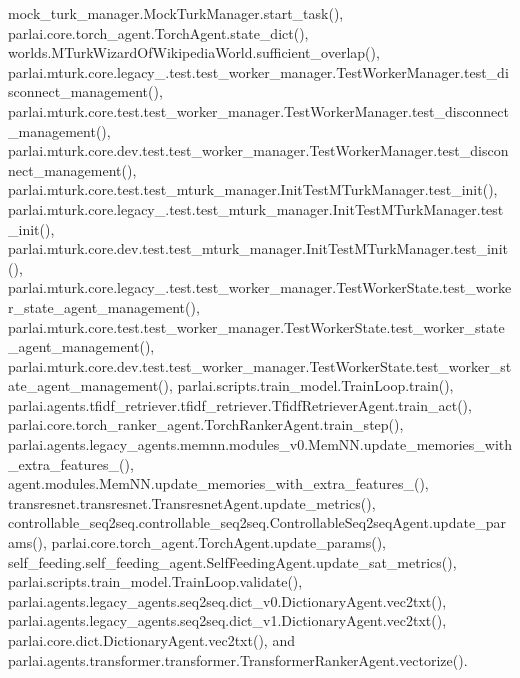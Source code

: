 mock\+\_\+turk\+\_\+manager.\+Mock\+Turk\+Manager.\+start\+\_\+task(), parlai.\+core.\+torch\+\_\+agent.\+Torch\+Agent.\+state\+\_\+dict(), worlds.\+M\+Turk\+Wizard\+Of\+Wikipedia\+World.\+sufficient\+\_\+overlap(), parlai.\+mturk.\+core.\+legacy\+\_.\+test.\+test\+\_\+worker\+\_\+manager.\+Test\+Worker\+Manager.\+test\+\_\+disconnect\+\_\+management(), parlai.\+mturk.\+core.\+test.\+test\+\_\+worker\+\_\+manager.\+Test\+Worker\+Manager.\+test\+\_\+disconnect\+\_\+management(), parlai.\+mturk.\+core.\+dev.\+test.\+test\+\_\+worker\+\_\+manager.\+Test\+Worker\+Manager.\+test\+\_\+disconnect\+\_\+management(), parlai.\+mturk.\+core.\+test.\+test\+\_\+mturk\+\_\+manager.\+Init\+Test\+M\+Turk\+Manager.\+test\+\_\+init(), parlai.\+mturk.\+core.\+legacy\+\_.\+test.\+test\+\_\+mturk\+\_\+manager.\+Init\+Test\+M\+Turk\+Manager.\+test\+\_\+init(), parlai.\+mturk.\+core.\+dev.\+test.\+test\+\_\+mturk\+\_\+manager.\+Init\+Test\+M\+Turk\+Manager.\+test\+\_\+init(), parlai.\+mturk.\+core.\+legacy\+\_.\+test.\+test\+\_\+worker\+\_\+manager.\+Test\+Worker\+State.\+test\+\_\+worker\+\_\+state\+\_\+agent\+\_\+management(), parlai.\+mturk.\+core.\+test.\+test\+\_\+worker\+\_\+manager.\+Test\+Worker\+State.\+test\+\_\+worker\+\_\+state\+\_\+agent\+\_\+management(), parlai.\+mturk.\+core.\+dev.\+test.\+test\+\_\+worker\+\_\+manager.\+Test\+Worker\+State.\+test\+\_\+worker\+\_\+state\+\_\+agent\+\_\+management(), parlai.\+scripts.\+train\+\_\+model.\+Train\+Loop.\+train(), parlai.\+agents.\+tfidf\+\_\+retriever.\+tfidf\+\_\+retriever.\+Tfidf\+Retriever\+Agent.\+train\+\_\+act(), parlai.\+core.\+torch\+\_\+ranker\+\_\+agent.\+Torch\+Ranker\+Agent.\+train\+\_\+step(), parlai.\+agents.\+legacy\+\_\+agents.\+memnn.\+modules\+\_\+v0.\+Mem\+N\+N.\+update\+\_\+memories\+\_\+with\+\_\+extra\+\_\+features\+\_\+(), agent.\+modules.\+Mem\+N\+N.\+update\+\_\+memories\+\_\+with\+\_\+extra\+\_\+features\+\_\+(), transresnet.\+transresnet.\+Transresnet\+Agent.\+update\+\_\+metrics(), controllable\+\_\+seq2seq.\+controllable\+\_\+seq2seq.\+Controllable\+Seq2seq\+Agent.\+update\+\_\+params(), parlai.\+core.\+torch\+\_\+agent.\+Torch\+Agent.\+update\+\_\+params(), self\+\_\+feeding.\+self\+\_\+feeding\+\_\+agent.\+Self\+Feeding\+Agent.\+update\+\_\+sat\+\_\+metrics(), parlai.\+scripts.\+train\+\_\+model.\+Train\+Loop.\+validate(), parlai.\+agents.\+legacy\+\_\+agents.\+seq2seq.\+dict\+\_\+v0.\+Dictionary\+Agent.\+vec2txt(), parlai.\+agents.\+legacy\+\_\+agents.\+seq2seq.\+dict\+\_\+v1.\+Dictionary\+Agent.\+vec2txt(), parlai.\+core.\+dict.\+Dictionary\+Agent.\+vec2txt(), and parlai.\+agents.\+transformer.\+transformer.\+Transformer\+Ranker\+Agent.\+vectorize().

